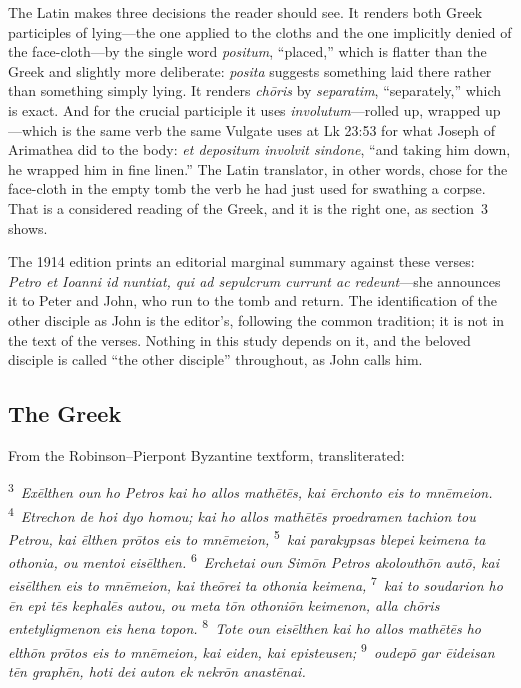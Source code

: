 The Latin makes three decisions the reader should see. It renders both Greek
participles of lying---the one applied to the cloths and the one implicitly
denied of the face-cloth---by the single word \emph{positum}, ``placed,''
which is flatter than the Greek and slightly more deliberate: \emph{posita}
suggests something laid there rather than something simply lying. It renders
\emph{ch\=oris} by \emph{separatim}, ``separately,'' which is exact. And for
the crucial participle it uses \emph{involutum}---rolled up, wrapped
up---which is the same verb the same Vulgate uses at Lk 23:53 for what Joseph
of Arimathea did to the body: \emph{et depositum involvit sindone}, ``and
taking him down, he wrapped him in fine linen.'' The Latin translator, in other
words, chose for the face-cloth in the empty tomb the verb he had just used for
swathing a corpse. That is a considered reading of the Greek, and it is the
right one, as section~3 shows.

The 1914 edition prints an editorial marginal summary against these verses:
\emph{Petro et Ioanni id nuntiat, qui ad sepulcrum currunt ac redeunt}---she
announces it to Peter and John, who run to the tomb and return. The
identification of the other disciple as John is the editor's, following the
common tradition; it is not in the text of the verses. Nothing in this study
depends on it, and the beloved disciple is called ``the other disciple''
throughout, as John calls him.

\subsection{The Greek}

From the Robinson--Pierpont Byzantine textform, transliterated:

\begin{studyframe}\small
\textsuperscript{3}~\emph{Ex\=elthen oun ho Petros kai ho allos math\=et\=es,
kai \=erchonto eis to mn\=emeion.} \textsuperscript{4}~\emph{Etrechon de hoi
dyo homou; kai ho allos math\=et\=es proedramen tachion tou Petrou, kai \=elthen
pr\=otos eis to mn\=emeion,} \textsuperscript{5}~\emph{kai parakypsas blepei
keimena ta othonia, ou mentoi eis\=elthen.} \textsuperscript{6}~\emph{Erchetai
oun Sim\=on Petros akolouth\=on aut\=o, kai eis\=elthen eis to mn\=emeion, kai
the\=orei ta othonia keimena,} \textsuperscript{7}~\emph{kai to soudarion ho \=en
epi t\=es kephal\=es autou, ou meta t\=on othoni\=on keimenon, alla ch\=oris
entetyligmenon eis hena topon.} \textsuperscript{8}~\emph{Tote oun eis\=elthen
kai ho allos math\=et\=es ho elth\=on pr\=otos eis to mn\=emeion, kai eiden,
kai episteusen;} \textsuperscript{9}~\emph{oudep\=o gar \=eideisan t\=en
graph\=en, hoti dei auton ek nekr\=on anast\=enai.}
\end{studyframe}

